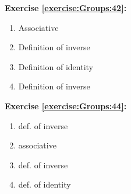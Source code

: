 \noindent\textbf{Exercise \ref{exercise:Groups:42}:}\\
\begin{multicols}{2}
\begin{enumerate}
\item
Associative

\item
Definition  of  inverse

\item
Definition of  identity

\item
Definition  of  inverse
\end{enumerate}
\end{multicols}

\noindent\textbf{Exercise \ref{exercise:Groups:44}:}
\begin{multicols}{2}
\begin{enumerate}
\item
def. of inverse

\item
associative

\item
def. of inverse

\item
def. of identity
\end{enumerate}
\end{multicols}

